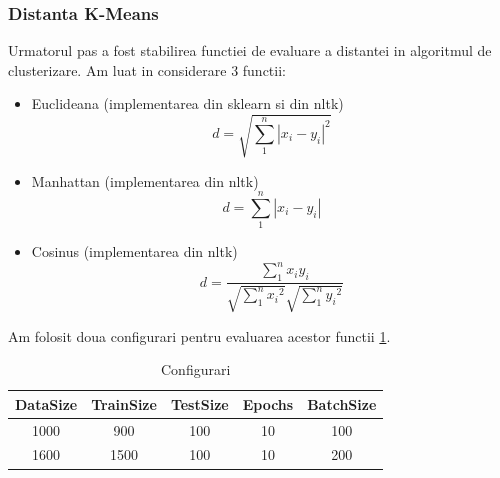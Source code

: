 \documentclass{article}
\begin{document}
\subsubsection{Distanta K-Means}
Urmatorul pas a fost stabilirea functiei de evaluare a distantei in algoritmul de clusterizare. Am luat in considerare 3 functii: 
\begin{itemize}
  \item Euclideana (implementarea din sklearn si din nltk)
	\begin{equation*}
	d = \sqrt{\sum_{1}^{n} {\left | x_{i} - y_{i} \right |}^2}
	\end{equation*}
  \item Manhattan (implementarea din nltk)
	\begin{equation*}
	d = \sum_{1}^{n} \left | x_{i} - y_{i} \right |
	\end{equation*}
  \item Cosinus (implementarea din nltk)
	\begin{equation*}
	d = \frac{\sum_{1}^{n} x_{i} y_{i}}{\sqrt{\sum_{1}^{n} {x_{i}}^2 } \sqrt{\sum_{1}^{n} {y_{i}}^2}}
	\end{equation*}
\end{itemize}

Am folosit doua configurari pentru evaluarea acestor functii \ref{tab:configDist}.
\begin{table}[h!]
 
  \begin{center}
    \caption{Configurari}
    \label{tab:configDist}
    \begin{tabular}{c|c|c|c|c}
      \textbf{DataSize} & \textbf{TrainSize} & \textbf{TestSize} & \textbf{Epochs} & \textbf{BatchSize} \\
      \hline
      1000 & 900 & 100  & 10 & 100 \\
      1600 & 1500 & 100 & 10 & 200 \\
      \end{tabular}
  \end{center}
\end{table}
\end{document}
